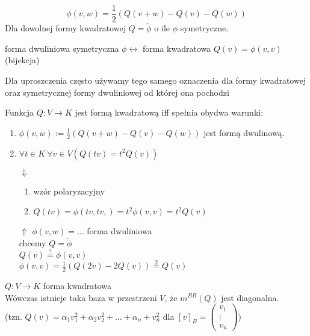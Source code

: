 \begin{ft} 
    \[ \phi(v,w) = \frac{1}{2} (Q(v+w) - Q(v) - Q(w)) \]
    Dla dowolnej formy kwadratowej $Q = \widetilde \phi$ o ile $\phi$ symetryczne. 
\end{ft}
\begin{wn} 
    forma dwuliniowa symetryczna $\phi \longleftrightarrow$ forma kwadratowa $Q(v) = 
    \phi(v,v)$ \hfill (bijekcja)
\end{wn} 
\begin{uw} 
    Dla uproszczenia często używamy tego samego oznaczenia dla formy kwadratowej oraz 
    symetrycznej formy dwuliniowej od której ona pochodzi
\end{uw} 
\begin{ft} 
    Funkcja $Q: V \to K$ jest formą kwadratową iff spełnia obydwa warunki:
    \begin{enumerate}[(1)]
        \item $\phi(v,w) := \frac{1}{2} (Q(v+w) - Q(v) - Q(w))$ jest formą dwulinową. 
        \item $\forall t \in K \ \forall v \in V ( Q(tv) = t^2 Q(v))$
    \end{enumerate} 
\end{ft} 
\begin{dd} 
    \begin{itemize} \hfill
        \item[$\Downarrow$] \begin{enumerate}[(1)] 
                                \item wzór polaryzacyjny 
                                \item $Q(tv) = \phi(tv,tv,)=t^2 \phi(v,v) = t^2 Q(v)$
                            \end{enumerate} 
        \item[$\Uparrow$] $\phi(v,w) = \ldots $ forma dwuliniowa \\ 
            chcemy $Q = \widetilde \phi$ \\ 
            $Q(v) \overset{?}{=} \phi(v,v)$ \\ 
            $\phi(v,v) = \frac{1}{2} (Q(2v)-2Q(v)) \overset{2}{=}Q(v)$
    \end{itemize} 
\end{dd} 
\begin{tw} 
    $Q: V \to K$ forma kwadratowa \\ 
    Wówczas istnieje taka baza w przestrzeni $V$, że $m^{BB}(Q)$ jest diagonalna.\\
    (tzn. $Q(v) = \alpha_1 v_1^2 + \alpha_2 v_2^2 + \ldots + \alpha_n + v_n^2$ dla 
    $[v]_B = \begin{pmatrix} v_1 \\ \vdots \\ v_n \end{pmatrix}$)
\end{tw} 
